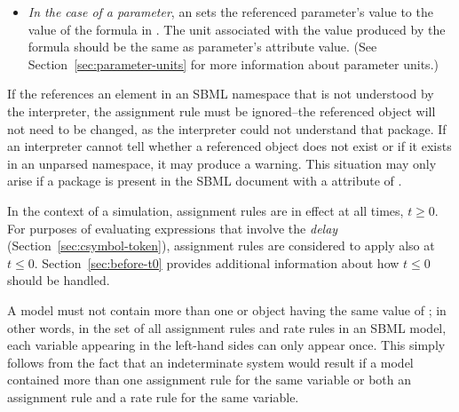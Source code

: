 \begin{itemize}
\item \emph{In the case of a parameter}, an \AssignmentRule sets
  the referenced parameter's value to the value of the formula in
  .  The unit associated with the value produced by
  the formula should be the same as parameter's 
  attribute value.  (See Section~\ref{sec:parameter-units} for
  more information about parameter units.)


\end{itemize}


\begin{blockChanged}
If the  references an element in an SBML namespace that is not
  understood by the interpreter, the assignment rule must be ignored--the 
  referenced object will not need to be changed, as the interpreter could not
  understand that package.  If an interpreter cannot tell whether 
  a referenced object does not exist or if it exists in an unparsed namespace,
  it may produce a warning.  This situation may only arise if a package is present in the SBML document with a  attribute of .
\end{blockChanged}

In the context of a simulation, assignment rules are in effect at
all times, $t \geq 0$.  For purposes of evaluating expressions
that involve the \emph{delay} 
(Section~\ref{sec:csymbol-token}), assignment rules are considered
to apply also at $t \leq 0$.  Section~\ref{sec:before-t0} provides
additional information about how $t \leq 0$ should be
  handled.

A model must not contain more than one \AssignmentRule or
\RateRule object having the same value of ; in
other words, in the set of all assignment rules and rate rules in
an SBML model, each variable appearing in the left-hand sides can
only appear once.  This simply follows from the fact that an
indeterminate system would result if a model contained more than
one assignment rule for the same variable or both an assignment
rule and a rate rule for the same variable.

